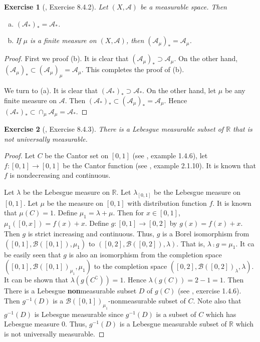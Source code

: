 \documentclass[11pt]{article}
\theoremstyle{plain}
\newtheorem{exercise}{Exercise}
\theoremstyle{definition}
\theoremstyle{remark}
\begin{document}
\begin{exercise}[\cite{book:992991}, Exercise 8.4.2]
    Let $(X, \mathscr A)$ be a measurable space. Then
    \begin{enumerate}[(a)]
        \item 
            $(\mathscr A_*)_* = \mathscr A_*$.
        \item
            If $\mu$ is a finite measure on $(X,\mathscr A)$, then $(\mathscr A_\mu)_* = \mathscr A_\mu$.
    \end{enumerate}
\end{exercise}
\begin{proof}
    First we proof (b). 
    It is clear that $(\mathscr A_\mu)_* \supset \mathscr A_\mu$.
    On the other hand, $(\mathscr A_\mu)_* \subset (\mathscr A_\mu)_\mu = \mathscr A_\mu$.
    This completes the proof of (b).

    We turn to (a). 
    It is clear that $(\mathscr A_*)_* \supset \mathscr A_*$.
    On the other hand, let $ \mu $ be any finite measure on $\mathscr A$.
    Then $(\mathscr A_*)_* \subset  (\mathscr A_\mu)_* = \mathscr A_{\mu}$.
    Hence $(\mathscr A_*)_* \subset  \cap_{\mu} \mathscr A_{\mu} = \mathscr A_*$.
\end{proof}

\begin{exercise}[\cite{book:992991}, Exercise 8.4.3]
    There is a Lebesgue measurable subset of $\mathbb R$ that is not universally measurable.
\end{exercise}
\begin{proof}
    Let $C$ be the Cantor set on $[0,1]$ (see  \cite{book:992991}, example 1.4.6), let $f:[0,1] \to [0,1]$ be the Cantor function (see \cite{book:992991}, example 2.1.10).
    It is known that $f$ is nondecreasing and continuous.

    Let $\lambda$ be the Lebesgue measure on $\mathbb R$.
    Let $\lambda_{[0,1]}$ be the Lebesgue measure on $[0,1]$.
    Let $\mu$ be the measure on $[0,1]$ with distribution function $f$.
    It is known that $\mu(C)=1$.
    Define $\mu_1=\lambda + \mu$.
    Then for $x\in [0,1]$, $\mu_1([0,x]) =f(x)+x$.
    Define $g:[0,1] \to [0,2]$ by $g(x)= f(x) + x$.
    Then $g$ is strict increasing and continuous.
    Thus, $g$ is a Borel isomorphism from $([0,1], \mathscr B ([0,1]), \mu_1)$ to $([0,2], \mathscr B([0,2]), \lambda)$.
    That is, $\lambda \comp g = \mu_1$.
    It ca be easily seen that $g$ is also an isomorphism from the completion space $([0,1], \mathscr B ([0,1])_{\mu_1}, \mu_1)$ to the completion space $([0,2], \mathscr B([0,2])_{\lambda}, \lambda)$.
    It can be shown that $\lambda(g(C^\complement))= 1 $. 
    Hence $\lambda(g(C))=2-1=1$.
    Then There is a Lebesgue \textbf{non}measurable subset $D$ of $g(C)$ (see \cite{book:992991}, exercise 1.4.6).
    Then $g^{-1}(D)$ is a $\mathscr B ([0,1])_{\mu_1}$-nonmeasurable subset of $C$.
    Note also that $g^{-1}(D)$ is Lebesgue measurable since $g^{-1} (D)$ is a subset of $C$ which has Lebesgue measure $0$.
    Thus, $g^{-1}(D)$ is a Lebesgue measurable subset of $\mathbb R$ which is not universally measurable.



\end{proof}




\end{document}
